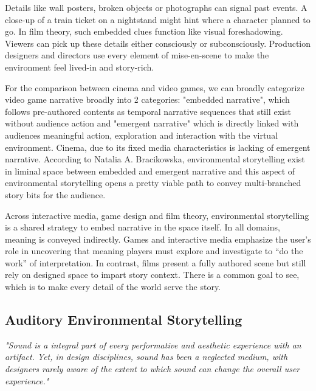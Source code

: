             Details like wall posters, broken objects or photographs can signal past events. A close-up of a train ticket on a nightstand might hint where a character planned to go. In film theory, such embedded clues function like visual foreshadowing. Viewers can pick up these details either consciously or subconsciously. Production designers and directors use every element of mise-en-scene to make the environment feel lived-in and story-rich.\par
            
            For the comparison between cinema and video games, we can broadly categorize video game narrative broadly into 2 categories: "embedded narrative", which follows pre-authored contents as temporal narrative sequences that still exist without audience action and "emergent narrative" which is directly linked with audiences meaningful action, exploration and interaction with the virtual environment\cite{Liminal_Space_Between_Embedded_and_Emergent_Narrative}. Cinema, due to its fixed media characteristics is lacking of emergent narrative. According to Natalia A. Bracikowska, environmental storytelling exist in liminal space between embedded and emergent narrative\cite{Liminal_Space_Between_Embedded_and_Emergent_Narrative} and this aspect of environmental storytelling opens a pretty viable path to convey multi-branched story bits for the audience.\par
            
            Across interactive media, game design and film theory, environmental storytelling is a shared strategy to embed narrative in the space itself. In all domains, meaning is conveyed indirectly. Games and interactive media emphasize the user’s role in uncovering that meaning players must explore and investigate to “do the work” of interpretation. In contrast, films present a fully authored scene but still rely on designed space to impart story context. There is a common goal to see, which is to make every detail of the world serve the story.\par
            \subsection{Auditory Environmental Storytelling}
            \emph{"Sound is a integral part of every performative and aesthetic experience with an artifact. Yet, in design disciplines, sound has been a neglected medium, with designers rarely aware of the extent to which sound can change the overall user experience."\cite{Sonic_Interaction_Design}}

